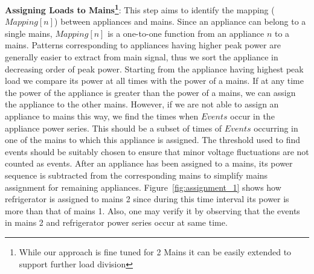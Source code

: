 \documentclass[conference]{IEEEtran}
\newcommand{\figref}[1]{Figure~\ref{#1}}
\begin{document}
\noindent\textbf{Assigning Loads to Mains\footnote{While our approach is fine tuned for 2 Mains it can be easily extended to support further load division}}:
This step aims to identify the mapping ($Mapping[n]$) between appliances and mains. Since an appliance can belong to a single mains, $Mapping[n]$ is a one-to-one function from an appliance $n$ to a mains. Patterns corresponding to appliances having higher peak power are generally easier to extract from main signal, thus we sort the appliance in decreasing order of peak power. Starting from the appliance having highest peak load we compare its power at all times with the power of a mains. If at any time the power of the appliance is greater than the power of a mains, we can assign the appliance to the other mains. However, if we are not able to assign an appliance to mains this way, we find the times when $Events$ occur in the appliance power series. This should be a subset of times of $Events$ occurring in one of the mains to which this appliance is assigned. The threshold used to find events should be suitably chosen to ensure that minor voltage fluctuations are not counted as events. After an appliance has been assigned to a mains, its power sequence is subtracted from the corresponding mains to simplify mains assignment for remaining appliances. \figref{fig:assignment_1} shows how refrigerator is assigned to mains 2 since during this time interval its power is more than that of mains 1. Also, one may verify it by observing that the events in mains 2 and refrigerator power series occur at same time.
\end{document}
